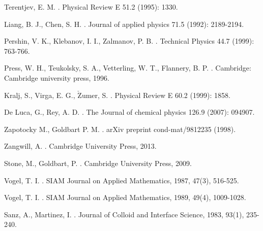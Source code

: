 \documentclass[nottitlepage]{article}
\begin{document}
\begin{thebibliography}{99}
Terentjev, E. M.
.
\newblock Physical Review E 51.2 (1995): 1330.

Liang, B. J., Chen, S. H.
.
\newblock Journal of applied physics 71.5 (1992): 2189-2194.

Pershin, V. K., Klebanov, I. I., Zalmanov, P. B.
.
\newblock Technical Physics 44.7 (1999): 763-766.



Press, W. H., Teukolsky, S. A., Vetterling, W. T., Flannery, B. P.
.
\newblock Cambridge: Cambridge university press, 1996.

Kralj, S., Virga, E. G., $\mathrm{\check{Z}}$umer, S.
.
\newblock Physical Review E 60.2 (1999): 1858.


De Luca, G., Rey, A. D.
.
\newblock The Journal of chemical physics 126.9 (2007): 094907.

Zapotocky M., Goldbart P. M.
.
\newblock arXiv preprint cond-mat/9812235 (1998).

Zangwill, A.
.
\newblock  Cambridge University Press, 2013.

Stone, M., Goldbart, P.
.
\newblock  Cambridge University Press, 2009.

Vogel, T. I.
.
\newblock  SIAM Journal on Applied Mathematics, 1987, 47(3), 516-525.

Vogel, T. I.
.
\newblock SIAM Journal on Applied Mathematics, 1989, 49(4), 1009-1028.

Sanz, A., Martinez, I.
.
\newblock Journal of Colloid and Interface Science, 1983, 93(1), 235-240.



\end{thebibliography}
\end{document}
